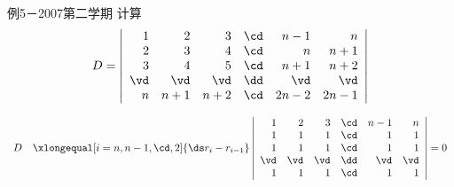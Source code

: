 \begin{frame}
  \begin{footnotesize}
    \begin{exampleblock}{例5－2007第二学期}
      计算
      $$
      D=\left|
      \begin{array}{rrrrrr}
        1&2&3&\cd&n-1&n\\
        2&3&4&\cd&n&n+1\\
        3&4&5&\cd&n+1&n+2\\
        \vd&\vd&\vd&\dd&\vd&\vd\\
        n&n+1&n+2&\cd&2n-2&2n-1
      \end{array}
      \right|
      $$
    \end{exampleblock}
    \pause\jiename
    $$
    \begin{array}{rl}
      D&\xlongequal[i=n,n-1,\cd,2]{\ds r_{i}-r_{i-1}}\left|
      \begin{array}{rrrrrr}
        1&2&3&\cd&n-1&n\\
        1&1&1&\cd&1&1\\
        1&1&1&\cd&1&1\\
        \vd&\vd&\vd&\dd&\vd&\vd\\
        1&1&1&\cd&1&1
      \end{array}
      \right|=0
    \end{array}
    $$

  \end{footnotesize}
\end{frame}


